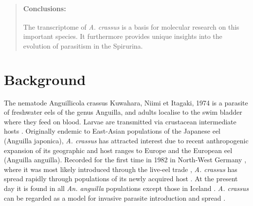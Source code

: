 \documentclass[10pt]{bmc_article}
\newenvironment{bmcformat}{\begin{raggedright}\baselineskip20pt\sloppy\setboolean{publ}{false}}{\end{raggedright}\baselineskip20pt\sloppy}
\begin{document}
\begin{bmcformat}
\begin{abstract}
  \paragraph*{Conclusions:}
  The transcriptome of \textit{A. crassus} is a basis for molecular
  research on this important species. It furthermore provides unique
  insights into the evolution of parasitism in the Spirurina.
\end{abstract}






\section*{Background}
 

The nematode Anguillicola crassus Kuwahara, Niimi et Itagaki, 1974
\cite{kuwahara_Niimi_Itagaki_1974} is a parasite of freshwater eels of
the genus Anguilla, and adults localise to the swim bladder where they
feed on blood. Larvae are transmitted via crustacean intermediate
hosts \cite{de_charleroy_life_1990}. Originally endemic to East-Asian
populations of the Japanese eel (Anguilla japonica),
\textit{A. crassus} has attracted interest due to recent anthropogenic
expansion of its geographic and host ranges to Europe and the European
eel (Anguilla anguilla). Recorded for the first time in 1982 in
North-West Germany \cite{fischer_teichwirt}, where it was most likely
introduced through the live-eel trade
\cite{koops_anguillicola-infestations_1989, koie_swimbladder_1991},
\textit{A. crassus} has spread rapidly through populations of its
newly acquired host \cite{kirk_impact_2003}. At the present day it is
found in all \textit{An. anguilla} populations except those in Iceland
\cite{kristmundsson_parasite_2007}. \textit{A. crassus} can be
regarded as a model for invasive parasite introduction and spread
\cite{taraschewski_hosts_2007}.


\end{bmcformat}
\end{document}
